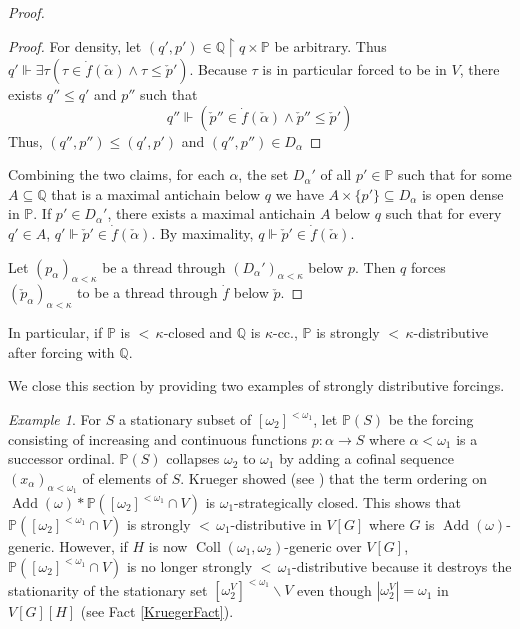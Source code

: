 \documentclass[12pt]{amsart}
\theoremstyle{definition}
\theoremstyle{remark}
\newtheorem{myex}[mydef]{Example}
\theoremstyle{plain}
\numberwithin{mydef}{section}
\DeclareMathOperator{\Add}{Add}
\DeclareMathOperator{\Coll}{Coll}
\newcommand{\dP}{\mathbb{P}}
\newcommand{\dQ}{\mathbb{Q}}
\newcommand{\uhr}{\upharpoonright}
\begin{document}
\begin{proof}
\begin{proof}
			For density, let $(q',p')\in\dQ\uhr q\times\dP$ be arbitrary. Thus $q'\Vdash\exists\tau(\tau\in\dot{f}(\check{\alpha})\wedge\tau\leq \check{p}')$. Because $\tau$ is in particular forced to be in $V$, there exists $q''\leq q'$ and $p''$ such that
			$$q''\Vdash(\check{p}''\in\dot{f}(\check{\alpha})\wedge \check{p}''\leq\check{p}')$$
			Thus, $(q'',p'')\leq(q',p')$ and $(q'',p'')\in D_{\alpha}$
		\end{proof}
		Combining the two claims, for each $\alpha$, the set $D_{\alpha}'$ of all $p'\in\dP$ such that for some $A\subseteq\dQ$ that is a maximal antichain below $q$ we have $A\times\{p'\}\subseteq D_{\alpha}$ is open dense in $\dP$. If $p'\in D_{\alpha}'$, there exists a maximal antichain $A$ below $q$ such that for every $q'\in A$, $q'\Vdash\check{p}'\in\dot{f}(\check{\alpha})$. By maximality, $q\Vdash\check{p}'\in\dot{f}(\check{\alpha})$.
			
		Let $(p_{\alpha})_{\alpha<\kappa}$ be a thread through $(D_{\alpha}')_{\alpha<\kappa}$ below $p$. Then $q$ forces $(\check{p}_{\alpha})_{\alpha<\kappa}$ to be a thread through $\dot{f}$ below $\check{p}$.
	\end{proof}
	
	In particular, if $\dP$ is ${<}\,\kappa$-closed and $\dQ$ is $\kappa$-cc., $\dP$ is strongly ${<}\,\kappa$-distributive after forcing with $\dQ$.
	
	We close this section by providing two examples of strongly distributive forcings.
	
	\begin{myex}
		For $S$ a stationary subset of $[\omega_2]^{<\omega_1}$, let $\dP(S)$ be the forcing consisting of increasing and continuous functions $p\colon\alpha\to S$ where $\alpha<\omega_1$ is a successor ordinal. $\dP(S)$ collapses $\omega_2$ to $\omega_1$ by adding a cofinal sequence $(x_{\alpha})_{\alpha<\omega_1}$ of elements of $S$. Krueger showed (see \cite[Proposition 2.2]{KruegerMitchellStyle}) that the term ordering on $\Add(\omega)*\dP([\omega_2]^{<\omega_1}\cap V)$ is $\omega_1$-strategically closed. This shows that $\dP([\omega_2]^{<\omega_1}\cap V)$ is strongly ${<}\,\omega_1$-distributive in $V[G]$ where $G$ is $\Add(\omega)$-generic. However, if $H$ is now $\Coll(\omega_1,\omega_2)$-generic over $V[G]$, $\dP([\omega_2]^{<\omega_1}\cap V)$ is no longer strongly ${<}\,\omega_1$-distributive because it destroys the stationarity of the stationary set $[\omega_2^V]^{<\omega_1}\smallsetminus V$ even though $|\omega_2^V|=\omega_1$ in $V[G][H]$ (see Fact \ref{KruegerFact}).
	\end{myex}
	
\end{document}
